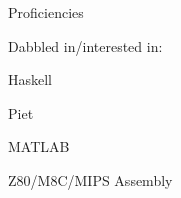\documentclass[letterpaper,12pt]{article}
\begin{document}
\begin{paracol}{2}
\begin{res_section}{Proficiencies}
\begin{res_subsection}{Dabbled in/interested in:}
   \item Haskell
   \item Piet
   \item MATLAB
   \item Z80/M8C/MIPS Assembly
\end{res_subsection}
\end{res_section}

\switchcolumn
  \vspace{6pt}


\end{paracol}
\end{document}
